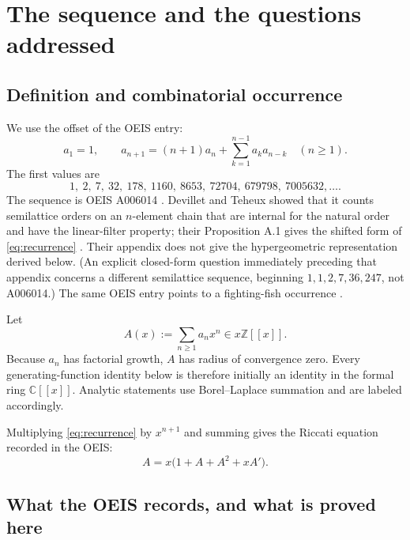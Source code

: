 \documentclass[11pt,a4paper]{article}
\theoremstyle{definition}
\theoremstyle{remark}
\newcommand{\C}{\mathbb{C}}
\newcommand{\Z}{\mathbb{Z}}
\begin{document}
\tableofcontents
\bigskip

\section{The sequence and the questions addressed}

\subsection{Definition and combinatorial occurrence}

We use the offset of the OEIS entry:
\begin{equation}\label{eq:recurrence}
 a_1=1,
 \qquad
 a_{n+1}=(n+1)a_n+\sum_{k=1}^{n-1}a_k a_{n-k}
 \quad(n\ge1).
\end{equation}
The first values are
\[
 1,\ 2,\ 7,\ 32,\ 178,\ 1160,\ 8653,\ 72704,\ 679798,\ 7005632,\ldots.
\]
The sequence is OEIS A006014 \cite{OEISA006014}.  Devillet and Teheux showed that it counts semilattice orders on an \(n\)-element chain that are internal for the natural order and have the linear-filter property; their Proposition A.1 gives the shifted form of \eqref{eq:recurrence} \cite{DevilletTeheux}.  Their appendix does not give the hypergeometric representation derived below.  (An explicit closed-form question immediately preceding that appendix concerns a different semilattice sequence, beginning \(1,1,2,7,36,247\), not A006014.)  The same OEIS entry points to a fighting-fish occurrence \cite{DuchiEtAl}.

Let
\begin{equation}\label{eq:Adef}
 A(x):=\sum_{n\ge1}a_nx^n\in x\Z[[x]].
\end{equation}
Because \(a_n\) has factorial growth, \(A\) has radius of convergence zero.  Every generating-function identity below is therefore initially an identity in the formal ring \(\C[[x]]\).  Analytic statements use Borel--Laplace summation and are labeled accordingly.

Multiplying \eqref{eq:recurrence} by \(x^{n+1}\) and summing gives the Riccati equation recorded in the OEIS:
\begin{equation}\label{eq:Riccati}
 A=x\bigl(1+A+A^2+xA'\bigr).
\end{equation}

\subsection{What the OEIS records, and what is proved here}
\end{document}
